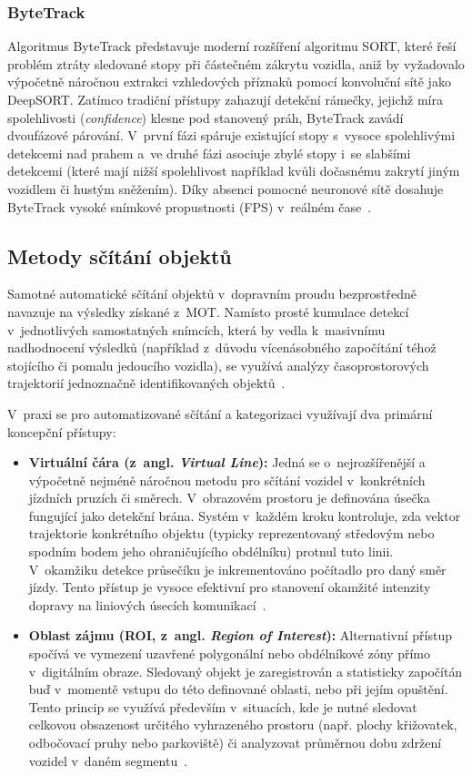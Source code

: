 \subsubsection{ByteTrack}
Algoritmus ByteTrack představuje moderní rozšíření algoritmu SORT, které řeší problém ztráty sledované stopy při částečném zákrytu vozidla, aniž by vyžadovalo výpočetně náročnou extrakci vzhledových příznaků pomocí konvoluční sítě jako DeepSORT. Zatímco tradiční přístupy zahazují detekční rámečky, jejichž míra spolehlivosti (\textit{confidence}) klesne pod stanovený práh, ByteTrack zavádí dvoufázové párování. V~první fázi spáruje existující stopy s~vysoce spolehlivými detekcemi nad prahem a~ve druhé fázi asociuje zbylé stopy i~se slabšími detekcemi (které mají nižší spolehlivost například kvůli dočasnému zakrytí jiným vozidlem či hustým sněžením). Díky absenci pomocné neuronové sítě dosahuje ByteTrack vysoké snímkové propustnosti (\acs{FPS}) v~reálném čase~\cite{zhang_bytetrack_2022}.

\subsection{Metody sčítání objektů}
Samotné automatické sčítání objektů v~dopravním proudu bezprostředně navazuje na výsledky získané z~\acs{MOT}. Namísto prosté kumulace detekcí v~jednotlivých samostatných snímcích, která by vedla k~masivnímu nadhodnocení výsledků (například z~důvodu vícenásobného započítání téhož stojícího či pomalu jedoucího vozidla), se využívá analýzy časoprostorových trajektorií jednoznačně identifikovaných objektů~\cite{zhou_traffic_survey_2024}.

V~praxi se pro automatizované sčítání a kategorizaci využívají dva primární koncepční přístupy:
\begin{itemize}
    \item \textbf{Virtuální čára (z~angl. \textit{Virtual Line}):} Jedná se o~nejrozšířenější a výpočetně nejméně náročnou metodu pro sčítání vozidel v~konkrétních jízdních pruzích či směrech. V~obrazovém prostoru je definována úsečka fungující jako detekční brána. Systém v~každém kroku kontroluje, zda vektor trajektorie konkrétního objektu (typicky reprezentovaný středovým nebo spodním bodem jeho ohraničujícího obdélníku) protnul tuto linii. V~okamžiku detekce průsečíku je inkrementováno počítadlo pro daný směr jízdy. Tento přístup je vysoce efektivní pro stanovení okamžité intenzity dopravy na liniových úsecích komunikací~\cite{zhou_traffic_survey_2024}.
    \item \textbf{Oblast zájmu (ROI, z~angl. \textit{Region of Interest}):} Alternativní přístup spočívá ve vymezení uzavřené polygonální nebo obdélníkové zóny přímo v~digitálním obraze. Sledovaný objekt je zaregistrován a statisticky započítán buď v~momentě vstupu do této definované oblasti, nebo při jejím opuštění. Tento princip se využívá především v~situacích, kde je nutné sledovat celkovou obsazenost určitého vyhrazeného prostoru (např. plochy křižovatek, odbočovací pruhy nebo parkoviště) či analyzovat průměrnou dobu zdržení vozidel v~daném segmentu~\cite{szeliski_computer_vision, zhou_traffic_survey_2024}.
\end{itemize}

